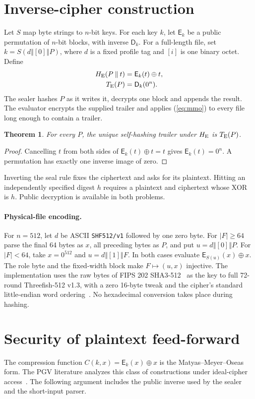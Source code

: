 \documentclass[10pt,twocolumn,letterpaper]{article}
\newtheorem{theorem}{Theorem}
\newcommand{\cat}{\mathbin\Vert}
\newcommand{\xor}{\mathbin\oplus}
\newcommand{\E}{\mathsf E}
\newcommand{\D}{\mathsf D}
\begin{document}
\section{Inverse-cipher construction}
Let \(S\) map byte strings to \(n\)-bit keys. For each key \(k\), let \(\E_k\) be a public permutation of \(n\)-bit blocks, with inverse \(\D_k\). For a full-length file, set \(k=S(d\cat[0]\cat P)\), where \(d\) is a fixed profile tag and \([i]\) is one binary octet. Define
\begin{align}
 H_{\rm E}(P\cat t)&=\E_k(t)\xor t, \label{eq:mmo}\\
 T_{\rm E}(P)&=\D_k(0^n). \label{eq:inverse}
\end{align}
The sealer hashes \(P\) as it writes it, decrypts one block and appends the result. The evaluator encrypts the supplied trailer and applies (\ref{eq:mmo}) to every file long enough to contain a trailer.

\begin{theorem}
For every \(P\), the unique self-hashing trailer under \(H_{\rm E}\) is \(T_{\rm E}(P)\).
\end{theorem}
\begin{proof}
Cancelling \(t\) from both sides of \(\E_k(t)\xor t=t\) gives \(\E_k(t)=0^n\). A permutation has exactly one inverse image of zero.
\end{proof}
Inverting the seal rule fixes the ciphertext and asks for its plaintext. Hitting an independently specified digest \(h\) requires a plaintext and ciphertext whose XOR is \(h\). Public decryption is available in both problems.

\paragraph{Physical-file encoding.}
For \(n=512\), let \(d\) be ASCII \texttt{SHF512/v1} followed by one zero byte. For \(|F|\ge64\) parse the final 64 bytes as \(x\), all preceding bytes as \(P\), and put \(u=d\cat[0]\cat P\). For \(|F|<64\), take \(x=0^{512}\) and \(u=d\cat[1]\cat F\). In both cases evaluate \(\E_{S(u)}(x)\xor x\). The role byte and the fixed-width block make \(F\mapsto(u,x)\) injective. The implementation uses the raw bytes of FIPS 202 SHA3-512~\cite{nist} as the key to full 72-round Threefish-512 v1.3, with a zero 16-byte tweak and the cipher's standard little-endian word ordering~\cite{threefish}. No hexadecimal conversion takes place during hashing.

\section{Security of plaintext feed-forward}
The compression function \(C(k,x)=\E_k(x)\xor x\) is the Matyas--Meyer--Oseas form. The PGV literature analyzes this class of constructions under ideal-cipher access~\cite{pgv}. The following argument includes the public inverse used by the sealer and the short-input parser.
\end{document}
